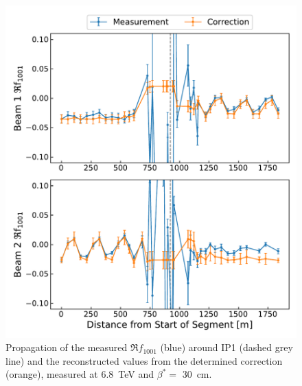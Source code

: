 \begin{figure}[!htb]
    \centering
    \includegraphics*[width=\textwidth]{Figures/IR_Coupling_Correction/commissioning_sbs_real_f1001_ip1.pdf}
    \caption{Propagation of the measured \(\Re f_{1001}\) (\textcolor{mplblue}{blue}) around IP\num{1} (dashed grey line) and the reconstructed values from the determined correction (\textcolor{mplorange}{orange}), measured at \qty{6.8}{\tera\electronvolt} and \(\beta^{*}=\) \qty{30}{\centi\meter}.}
    \label{figure:commissioning_sbs_real_f1001_ip1}
\end{figure}
  
